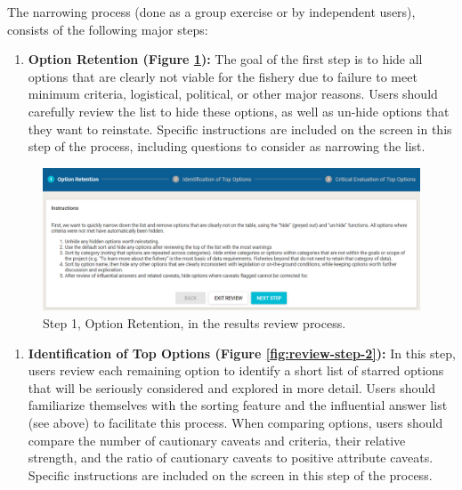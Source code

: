 \documentclass[11pt,]{book}
\providecommand{\tightlist}{%
  \setlength{\itemsep}{0pt}\setlength{\parskip}{0pt}}
\begin{document}
The narrowing process (done as a group exercise or by independent users), consists of the following major steps:

\begin{enumerate}
\def\labelenumi{\arabic{enumi}.}
\tightlist
\item
  \textbf{Option Retention (Figure \ref{fig:review-step-1}):} The goal of the first step is to hide all options that are clearly not viable for the fishery due to failure to meet minimum criteria, logistical, political, or other major reasons. Users should carefully review the list to hide these options, as well as un-hide options that they want to reinstate. Specific instructions are included on the screen in this step of the process, including questions to consider as narrowing the list.
\end{enumerate}

\begin{figure}

{\centering \includegraphics[width=0.95\linewidth]{images/review-step-1} 

}

\caption{Step 1, Option Retention, in the results review process.}\label{fig:review-step-1}
\end{figure}

\begin{enumerate}
\def\labelenumi{\arabic{enumi}.}
\setcounter{enumi}{1}
\tightlist
\item
  \textbf{Identification of Top Options (Figure \ref{fig:review-step-2}):} In this step, users review each remaining option to identify a short list of starred options that will be seriously considered and explored in more detail. Users should familiarize themselves with the sorting feature and the influential answer list (see above) to facilitate this process. When comparing options, users should compare the number of cautionary caveats and criteria, their relative strength, and the ratio of cautionary caveats to positive attribute caveats. Specific instructions are included on the screen in this step of the process.
\end{enumerate}
\end{document}
